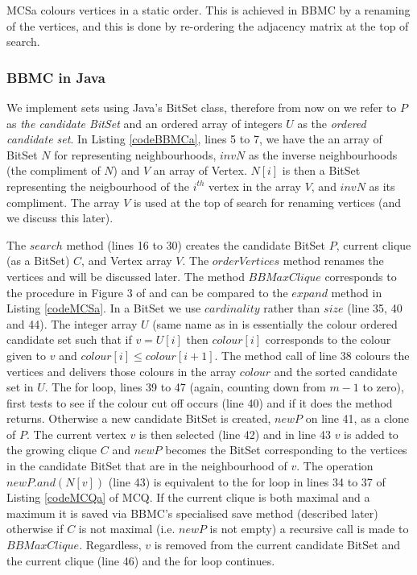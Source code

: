 \documentclass{l4proj}
\begin{document}
MCSa colours vertices in a static order. This is achieved in BBMC by a renaming of the vertices, and this is done by
re-ordering the adjacency matrix at the top of search.

\subsubsection{BBMC in Java}
We implement sets using Java's BitSet class, therefore from now on we refer to $P$ as \emph{the candidate BitSet} and
an ordered array of integers $U$ as the \emph{ordered candidate set}.
In Listing \ref{codeBBMCa}, lines 5 to 7, we have the an array of BitSet $N$ for representing neighbourhoods,
$invN$ as the inverse neighbourhoods (the compliment of $N$) and $V$ an array of Vertex.
$N[i]$ is then a BitSet representing the neigbourhood of the $i^{th}$ vertex in the array $V$, and $invN$ as its compliment.
The array $V$ is used at the top of search for renaming vertices (and we discuss this later).

The $search$ method (lines 16 to 30) creates the candidate BitSet $P$, current clique (as a BitSet) $C$, and Vertex array $V$. 
The $orderVertices$ method
renames the vertices and will be discussed later. The method $BBMaxClique$ corresponds to the procedure in Figure 3 of \cite{segundo2011}
and can be compared to the $expand$ method in Listing \ref{codeMCSa}. In a BitSet we use $cardinality$ rather than $size$ (line 35, 40 and 44).
The integer array $U$ (same name as in \cite{segundo2011} is essentially the colour ordered candidate set such that
if $v = U[i]$ then $colour[i]$ corresponds to the colour given to $v$ and $colour[i] \leq colour[i+1]$. The method call
of line 38 colours the vertices and delivers those colours in the array $colour$ and the sorted candidate set in $U$. The
for loop, lines 39 to 47 (again, counting down from $m-1$ to zero), first tests to see if the colour cut off occurs (line 40) and if it 
does the method returns. Otherwise a new candidate BitSet is created, $newP$ on line 41, as a clone of $P$. The current vertex $v$ is 
then selected (line 42) and in line 43 $v$ is added to the growing clique $C$ and $newP$ becomes the BitSet corresponding to
the vertices in the candidate BitSet that are in the neighbourhood of $v$. The operation $newP.and(N[v])$ (line 43) is equivalent to the for loop
in lines 34 to 37 of Listing \ref{codeMCQa} of MCQ. If the current clique is both maximal and a maximum it is saved via BBMC's specialised
save method (described later) otherwise if $C$ is not maximal (i.e. $newP$ is not empty) a recursive call is made
to $BBMaxClique$. Regardless, $v$ is removed from the current candidate BitSet and the current clique (line 46) and the for loop continues.
\end{document}
